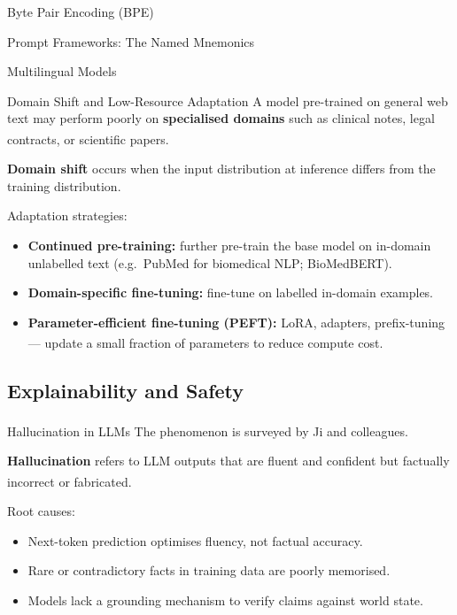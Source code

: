 \begin{v3topic}{Byte Pair Encoding (BPE)}
\begin{v3topic}{Prompt Frameworks: The Named Mnemonics}
\begin{v3topic}{Multilingual Models}
\end{v3topic}
\begin{v3topic}{Domain Shift and Low-Resource Adaptation}
    A model pre-trained on general web text may perform poorly on \textbf{specialised
    domains} such as clinical notes, legal contracts, or scientific
    papers.\textsuperscript{\cite[][p.~170]{raschkaBuildLargeLanguage2025}}

    \textbf{Domain shift} occurs when the input distribution at inference differs from
    the training distribution.

    Adaptation strategies:
    \begin{itemize}
        \item \textbf{Continued pre-training:} further pre-train the base model on
              in-domain unlabelled text (e.g.\ PubMed for biomedical NLP; BioMedBERT).
        \item \textbf{Domain-specific fine-tuning:} fine-tune on labelled in-domain
              examples.
        \item \textbf{Parameter-efficient fine-tuning (PEFT):} LoRA, adapters,
              prefix-tuning --- update a small fraction of parameters to reduce compute
              cost.\textsuperscript{\cite[][p.~322]{raschkaBuildLargeLanguage2025}}
    \end{itemize}

\end{v3topic}

\subsection{Explainability and Safety}


\begin{v3topic}{Hallucination in LLMs}
    The phenomenon is surveyed by Ji and
    colleagues\textsuperscript{\cite{jiSurveyHallucinationNatural2023}}.

    \textbf{Hallucination} refers to LLM outputs that are fluent and confident but
    factually incorrect or
    fabricated.\textsuperscript{\cite[][p.~xii]{dhamaniIntroductionGenerativeAI2024}}

    Root causes:
    \begin{itemize}
        \item Next-token prediction optimises fluency, not factual accuracy.
        \item Rare or contradictory facts in training data are poorly memorised.
        \item Models lack a grounding mechanism to verify claims against world state.
    \end{itemize}


\end{v3topic}
\end{v3topic}
\end{v3topic}
